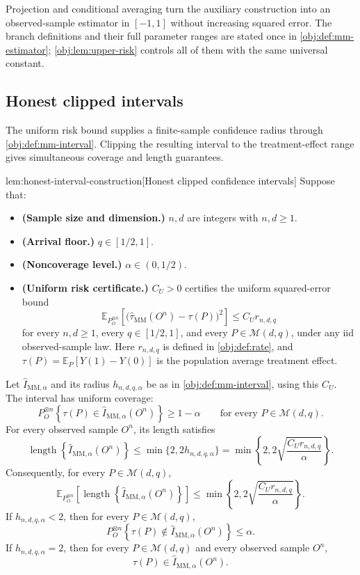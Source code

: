 Projection and conditional averaging turn the auxiliary construction into an observed-sample estimator in \([-1,1]\) without increasing squared error. The branch definitions and their full parameter ranges are stated once in \cref{obj:def:mm-estimator}; \cref{obj:lem:upper-risk} controls all of them with the same universal constant.

\subsection{Honest clipped intervals}

The uniform risk bound supplies a finite-sample confidence radius through \cref{obj:def:mm-interval}. Clipping the resulting interval to the treatment-effect range gives simultaneous coverage and length guarantees.

\begin{lemmav}{lem:honest-interval-construction}[Honest clipped confidence intervals]
Suppose that:
\begin{itemize}
\item \textbf{(Sample size and dimension.)} \(n,d\) are integers with \(n,d\ge 1\).
\item \textbf{(Arrival floor.)} \(q\in[1/2,1]\).
\item \textbf{(Noncoverage level.)} \(\alpha\in(0,1/2)\).
\item \textbf{(Uniform risk certificate.)} \(C_U>0\) certifies the uniform squared-error bound
\[
\mathbb E_{P_O^{\otimes n}}
\left[
  \bigl(\widehat\tau_{\mathrm{MM}}(O^n)-\tau(P)\bigr)^2
\right]
\le C_U r_{n,d,q}
\]
for every \(n,d\ge1\), every \(q\in[1/2,1]\), and every \(P\in\mathcal M(d,q)\), under any iid observed-sample law. Here \(r_{n,d,q}\) is defined in \cref{obj:def:rate}, and
\(\tau(P)=\mathbb E_P[Y(1)-Y(0)]\) is the population average treatment effect.
\end{itemize}
Let \(\widehat I_{\mathrm{MM},\alpha}\) and its radius \(h_{n,d,q,\alpha}\) be as in \cref{obj:def:mm-interval}, using this \(C_U\). The interval has uniform coverage:
\[
P_O^{\otimes n}
\left\{
  \tau(P)\in\widehat I_{\mathrm{MM},\alpha}(O^n)
\right\}
\ge 1-\alpha
\qquad
\text{for every }P\in\mathcal M(d,q).
\]
For every observed sample \(O^n\), its length satisfies
\[
\operatorname{length}
\left\{\widehat I_{\mathrm{MM},\alpha}(O^n)\right\}
\le
\min\{2,2h_{n,d,q,\alpha}\}
=
\min\left\{2,2\sqrt{\frac{C_Ur_{n,d,q}}{\alpha}}\right\}.
\]
Consequently, for every \(P\in\mathcal M(d,q)\),
\[
\mathbb E_{P_O^{\otimes n}}
\left[
  \operatorname{length}
  \left\{\widehat I_{\mathrm{MM},\alpha}(O^n)\right\}
\right]
\le
\min\left\{2,2\sqrt{\frac{C_Ur_{n,d,q}}{\alpha}}\right\}.
\]
If \(h_{n,d,q,\alpha}<2\), then for every \(P\in\mathcal M(d,q)\),
\[
P_O^{\otimes n}
\left\{
  \tau(P)\notin\widehat I_{\mathrm{MM},\alpha}(O^n)
\right\}
\le\alpha.
\]
If \(h_{n,d,q,\alpha}=2\), then for every \(P\in\mathcal M(d,q)\) and every observed sample \(O^n\),
\[
\tau(P)\in\widehat I_{\mathrm{MM},\alpha}(O^n).
\]
\end{lemmav}

